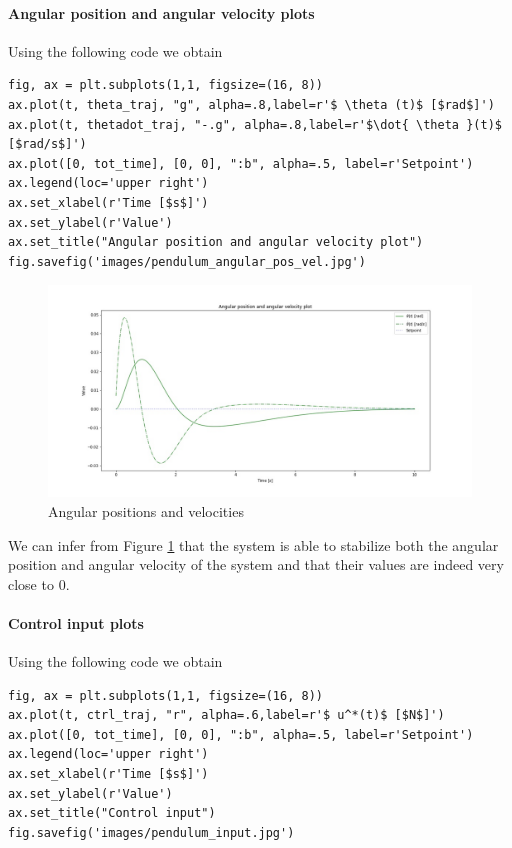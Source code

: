 \paragraph{Angular position and angular velocity plots}
Using the following code we obtain
\begin{verbatim}
fig, ax = plt.subplots(1,1, figsize=(16, 8))
ax.plot(t, theta_traj, "g", alpha=.8,label=r'$ \theta (t)$ [$rad$]')
ax.plot(t, thetadot_traj, "-.g", alpha=.8,label=r'$\dot{ \theta }(t)$ [$rad/s$]')
ax.plot([0, tot_time], [0, 0], ":b", alpha=.5, label=r'Setpoint')
ax.legend(loc='upper right')
ax.set_xlabel(r'Time [$s$]')
ax.set_ylabel(r'Value')
ax.set_title("Angular position and angular velocity plot")
fig.savefig('images/pendulum_angular_pos_vel.jpg')
\end{verbatim}

\begin{figure}[h!]
    \centering
    \includegraphics[width=\textwidth]{images/1-pendulum_angular_pos_vel.jpg}
    \caption{Angular positions and velocities}
    \label{fig:cartpole_ang}
\end{figure}

We can infer from Figure \ref{fig:cartpole_ang} that the system is able to stabilize both the angular position and angular velocity of the system and that their values are indeed very close to $0$.

\paragraph{Control input plots}
Using the following code we obtain
\begin{verbatim}
fig, ax = plt.subplots(1,1, figsize=(16, 8))
ax.plot(t, ctrl_traj, "r", alpha=.6,label=r'$ u^*(t)$ [$N$]')
ax.plot([0, tot_time], [0, 0], ":b", alpha=.5, label=r'Setpoint')
ax.legend(loc='upper right')
ax.set_xlabel(r'Time [$s$]')
ax.set_ylabel(r'Value')
ax.set_title("Control input")
fig.savefig('images/pendulum_input.jpg')
\end{verbatim}

